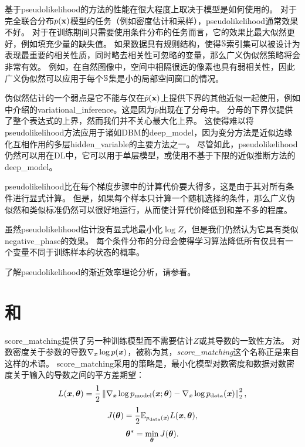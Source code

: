 基于\gls{pseudolikelihood}的方法的性能在很大程度上取决于模型是如何使用的。
对于完全联合分布$p(\mathbf{x})$模型的任务（例如密度估计和采样），\gls{pseudolikelihood}通常效果不好。
对于在训练期间只需要使用条件分布的任务而言，它的效果比最大似然更好，例如填充少量的缺失值。
如果数据具有规则结构，使得$\mathbb{S}$索引集可以被设计为表现最重要的相关性质，同时略去相关性可忽略的变量，那么广义伪似然策略将会非常有效。
例如，在自然图像中，空间中相隔很远的像素也具有弱相关性，因此广义伪似然可以应用于每个$\mathbb{S}$集是小的局部空间窗口的情况。


伪似然估计的一个弱点是它不能与仅在$\tilde{p}(\mathbf{x})$上提供下界的其他近似一起使用，例如中介绍的\gls{variational_inference}。这是因为$\tilde{p}$出现在了分母中。
分母的下界仅提供了整个表达式的上界，然而我们并不关心最大化上界。
这使得难以将\gls{pseudolikelihood}方法应用于诸如\gls{DBM}的\gls{deep_model}，因为变分方法是近似边缘化互相作用的多层\gls{hidden_variable}的主要方法之一。
尽管如此，\gls{pseudolikelihood}仍然可以用在\gls{DL}中，它可以用于单层模型，或使用不基于下限的近似推断方法的\gls{deep_model}。


\gls{pseudolikelihood}比在每个梯度步骤中的计算代价要大得多，这是由于其对所有条件进行显式计算。
但是，如果每个样本只计算一个随机选择的条件，那么广义伪似然和类似标准仍然可以很好地运行，从而使计算代价降低到和差不多的程度\citep{Goodfellow-et-al-NIPS2013}。


虽然\gls{pseudolikelihood}估计没有显式地最小化$\log Z$，但是我们仍然认为它具有类似\gls{negative_phase}的效果。
每个条件分布的分母会使得学习算法降低所有仅具有一个变量不同于训练样本的状态的概率。


了解\gls{pseudolikelihood}的渐近效率理论分析，请参看\cite{Marlin11-small}。


\section{和}
\label{sec:score_matching_and_ratio_matching}
\gls{score_matching}\citep{Hyvarinen-2005-small}提供了另一种训练模型而不需要估计$Z$或其导数的一致性方法。
对数密度关于参数的导数$\nabla_{\boldsymbol{\mathit{x}}} \log p(\boldsymbol{\mathit{x}})$，被称为其，\emph{\gls{score_matching}}这个名称正是来自这样的术语。
\gls{score_matching}采用的策略是，最小化模型对数密度和数据对数密度关于输入的导数之间的平方差期望：
\begin{equation}
	L(\boldsymbol{\mathit{x}}, \boldsymbol{\theta}) = \frac{1}{2} \left\lVert  \nabla_{\boldsymbol{\mathit{x}}} \log p_{\text{model}}(\boldsymbol{\mathit{x}}; \boldsymbol{\theta}) - \nabla_{\boldsymbol{\mathit{x}}} \log p_{\text{data}} (\boldsymbol{\mathit{x}})  \right\rVert_2^2,
\end{equation}
\begin{equation}
	J(\boldsymbol{\theta}) = \frac{1}{2} \mathbb{E}_{p_{\text{data}}(\boldsymbol{\mathit{x}})}  L(\boldsymbol{\mathit{x}}, \boldsymbol{\theta}),
\end{equation}
\begin{equation}
	\boldsymbol{\theta}^* = \min_{\boldsymbol{\theta}} J(\boldsymbol{\theta}) .
\end{equation}


